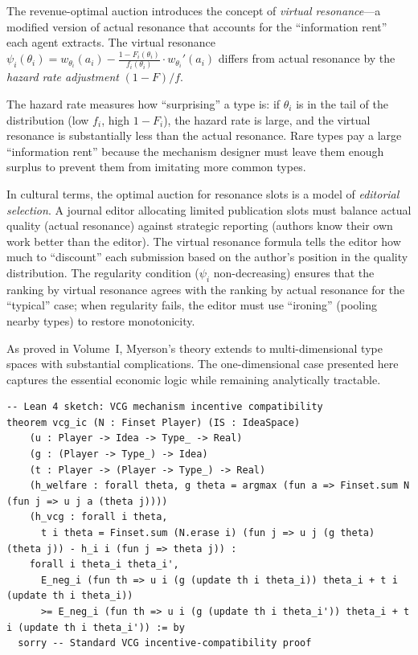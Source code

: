 \begin{interpretation}
The revenue-optimal auction introduces the concept of \emph{virtual
resonance}---a modified version of actual resonance that accounts for
the ``information rent'' each agent extracts.  The virtual resonance
$\psi_i(\theta_i) = w_{\theta_i}(a_i) - \frac{1-F_i(\theta_i)}{f_i(\theta_i)}
\cdot w_{\theta_i}'(a_i)$ differs from actual resonance by the
\emph{hazard rate adjustment} $(1-F)/f$.

The hazard rate measures how ``surprising'' a type is: if $\theta_i$ is
in the tail of the distribution (low $f_i$, high $1-F_i$), the hazard
rate is large, and the virtual resonance is substantially less than the
actual resonance.  Rare types pay a large ``information rent'' because
the mechanism designer must leave them enough surplus to prevent them
from imitating more common types.

In cultural terms, the optimal auction for resonance slots is a model
of \emph{editorial selection}.  A journal editor allocating limited
publication slots must balance actual quality (actual resonance) against
strategic reporting (authors know their own work better than the editor).
The virtual resonance formula tells the editor how much to ``discount''
each submission based on the author's position in the quality distribution.
The regularity condition ($\psi_i$ non-decreasing) ensures that the
ranking by virtual resonance agrees with the ranking by actual resonance
for the ``typical'' case; when regularity fails, the editor must use
``ironing'' (pooling nearby types) to restore monotonicity.

As proved in Volume~I, Myerson's theory extends to multi-dimensional
type spaces with substantial complications.  The one-dimensional case
presented here captures the essential economic logic while remaining
analytically tractable.
\end{interpretation}

\begin{lstlisting}
-- Lean 4 sketch: VCG mechanism incentive compatibility
theorem vcg_ic (N : Finset Player) (IS : IdeaSpace)
    (u : Player -> Idea -> Type_ -> Real)
    (g : (Player -> Type_) -> Idea)
    (t : Player -> (Player -> Type_) -> Real)
    (h_welfare : forall theta, g theta = argmax (fun a => Finset.sum N (fun j => u j a (theta j))))
    (h_vcg : forall i theta,
      t i theta = Finset.sum (N.erase i) (fun j => u j (g theta) (theta j)) - h_i i (fun j => theta j)) :
    forall i theta_i theta_i',
      E_neg_i (fun th => u i (g (update th i theta_i)) theta_i + t i (update th i theta_i))
      >= E_neg_i (fun th => u i (g (update th i theta_i')) theta_i + t i (update th i theta_i')) := by
  sorry -- Standard VCG incentive-compatibility proof
\end{lstlisting}




